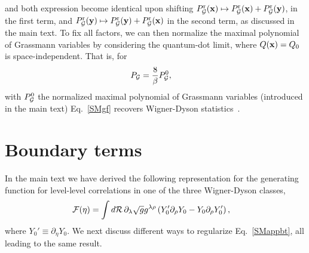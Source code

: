 \documentclass[twocolumn,showpacs,aps,prl]{revtex4}
\begin{document}
and both expression become identical upon 
 shifting 
$P_{\cal G}^{\rm r}(\bold{x})
\mapsto
P_{\cal G}^{\rm r}(\bold{x})
+
P_{\cal G}^{\rm r}(\bold{y})$, 
in the first term, 
and 
$P_{\cal G}^{\rm r}(\bold{y})
\mapsto
P_{\cal G}^{\rm r}(\bold{y})
+
P_{\cal G}^{\rm r}(\bold{x})$  in the second term, as discussed in the main text.
To fix all factors, we can then 
normalize the maximal polynomial of Grassmann
variables by considering the 
quantum-dot limit, where $Q(\bold{x})=Q_0$ is space-independent. That is,
for  
\begin{align}
P_{\cal G}
&={8\over\beta} P^0_{\cal G},
\end{align}
with $P^0_{\cal G}$ the normalized maximal polynomial of Grassmann variables 
(introduced in the main text) 
Eq.~\eqref{SMgf} recovers Wigner-Dyson statistics~\cite{SuppMatfn1}.







\section{Boundary terms}

In the main text we have derived the 
following 
representation for the generating function
for level-level correlations in one of 
the three Wigner-Dyson classes,
\begin{align}
\label{SMappbt}
{\cal F}(\eta)
&=
\int d{\cal R} \,
\partial_\lambda
 \sqrt{g} g^{\lambda\rho}
 \left( 
Y_0' 
\partial_\rho  Y_0
-
Y_0 
\partial_\rho  Y_0'
 \right),
\end{align}
where $Y_0'\equiv\partial_\eta Y_0$. 
We next discuss different ways to regularize Eq.~\eqref{SMappbt}, all  
leading to the same result. 
\end{document}
